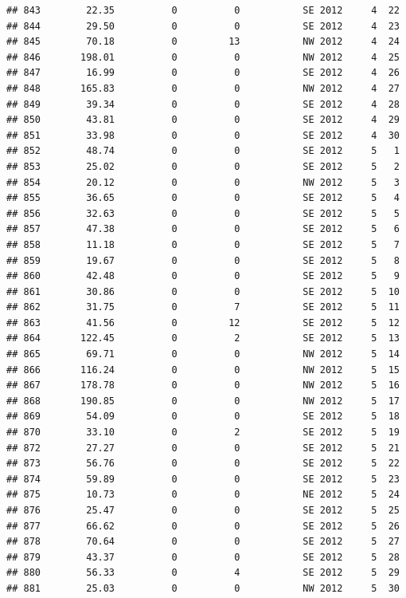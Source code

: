 \documentclass[
]{article}
\begin{document}
\begin{verbatim}
## 843        22.35          0          0           SE 2012     4  22
## 844        29.50          0          0           SE 2012     4  23
## 845        70.18          0         13           NW 2012     4  24
## 846       198.01          0          0           NW 2012     4  25
## 847        16.99          0          0           SE 2012     4  26
## 848       165.83          0          0           NW 2012     4  27
## 849        39.34          0          0           SE 2012     4  28
## 850        43.81          0          0           SE 2012     4  29
## 851        33.98          0          0           SE 2012     4  30
## 852        48.74          0          0           SE 2012     5   1
## 853        25.02          0          0           SE 2012     5   2
## 854        20.12          0          0           NW 2012     5   3
## 855        36.65          0          0           SE 2012     5   4
## 856        32.63          0          0           SE 2012     5   5
## 857        47.38          0          0           SE 2012     5   6
## 858        11.18          0          0           SE 2012     5   7
## 859        19.67          0          0           SE 2012     5   8
## 860        42.48          0          0           SE 2012     5   9
## 861        30.86          0          0           SE 2012     5  10
## 862        31.75          0          7           SE 2012     5  11
## 863        41.56          0         12           SE 2012     5  12
## 864       122.45          0          2           SE 2012     5  13
## 865        69.71          0          0           NW 2012     5  14
## 866       116.24          0          0           NW 2012     5  15
## 867       178.78          0          0           NW 2012     5  16
## 868       190.85          0          0           NW 2012     5  17
## 869        54.09          0          0           SE 2012     5  18
## 870        33.10          0          2           SE 2012     5  19
## 872        27.27          0          0           SE 2012     5  21
## 873        56.76          0          0           SE 2012     5  22
## 874        59.89          0          0           SE 2012     5  23
## 875        10.73          0          0           NE 2012     5  24
## 876        25.47          0          0           SE 2012     5  25
## 877        66.62          0          0           SE 2012     5  26
## 878        70.64          0          0           SE 2012     5  27
## 879        43.37          0          0           SE 2012     5  28
## 880        56.33          0          4           SE 2012     5  29
## 881        25.03          0          0           NW 2012     5  30

\end{verbatim}
\end{document}
